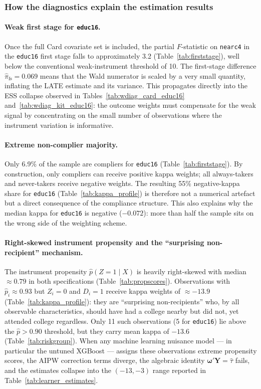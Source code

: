 \documentclass[12pt]{article}
\begin{document}
\subsubsection*{How the diagnostics explain the estimation results}

\paragraph{Weak first stage for \texttt{educ16}.}
Once the full Card covariate set is included, the partial $F$-statistic
on \texttt{nearc4} in the \texttt{educ16} first stage falls to
approximately 3.2 (Table~\ref{tab:firststage}), well below the
conventional weak-instrument threshold of 10.  The first-stage
difference $\hat\pi_\text{fs} = 0.069$ means that the Wald numerator is
scaled by a very small quantity, inflating the LATE estimate and its
variance.  This propagates directly into the ESS collapse observed in
Tables~\ref{tab:wdiag_card_educ16} and~\ref{tab:wdiag_kit_educ16}:
the outcome weights must compensate for the weak signal by
concentrating on the small number of observations where the instrument
variation is informative.

\paragraph{Extreme non-complier majority.}
Only 6.9\% of the sample are compliers for \texttt{educ16}
(Table~\ref{tab:firststage}).  By construction, only compliers can
receive positive kappa weights; all always-takers and never-takers
receive negative weights.  The resulting 55\% negative-kappa share for
\texttt{educ16} (Table~\ref{tab:kappa_profile}) is therefore not a
numerical artefact but a direct consequence of the compliance structure.
This also explains why the median kappa for \texttt{educ16} is negative
($-0.072$): more than half the sample sits on the wrong side of the
weighting scheme.

\paragraph{Right-skewed instrument propensity and the ``surprising
non-recipient'' mechanism.}
The instrument propensity $\hat{p}(Z{=}1\mid X)$ is heavily
right-skewed with median $\approx 0.79$ in both specifications
(Table~\ref{tab:propscores}).  Observations with $\hat{p}_i \approx
0.93$ but $Z_i = 0$ and $D_i = 1$ receive kappa weights of
$\approx -13.9$ (Table~\ref{tab:kappa_profile}): they are ``surprising
non-recipients'' who, by all observable characteristics, should have
had a college nearby but did not, yet attended college regardless.  Only
11 such observations (5 for \texttt{educ16}) lie above the
$\hat{p}>0.90$ threshold, but they carry mean kappa of $-13.6$
(Table~\ref{tab:riskgroup}).  When any machine learning nuisance model
--- in particular the untuned XGBoost --- assigns these observations
extreme propensity scores, the AIPW correction terms diverge, the
algebraic identity $\boldsymbol{\omega}'\mathbf{Y}=\hat\tau$ fails, and
the estimates collapse into the $(-13, -3)$ range reported in
Table~\ref{tab:learner_estimates}.
\end{document}
